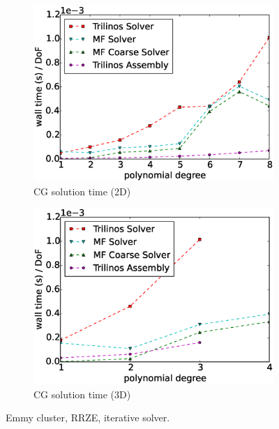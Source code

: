 \documentclass[times,doublespace]{nmeauth}
\begin{document}
\begin{figure}[!ht]
\begin{subfigure}[b]{0.49\textwidth}
    \includegraphics[width=\textwidth]{Emmy_RRZE_solver2d.eps}
    \caption{CG solution time (2D)}
    \label{fig:benchmark_miehe_Emmy_sol2}
  \end{subfigure}
  \begin{subfigure}[b]{0.49\textwidth}
    \centering
    \includegraphics[width=\textwidth]{Emmy_RRZE_solver3d.eps}
    \caption{CG solution time (3D)}
    \label{fig:benchmark_miehe_Emmy_sol3}
  \end{subfigure}
  \caption{Emmy cluster, RRZE, iterative solver.}%
  \label{fig:benchmark_miehe_Emmy_cg}
\end{figure}
\end{document}
